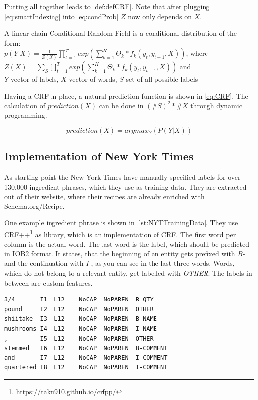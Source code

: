 \documentclass[12pt, twoside]{report}
\begin{document}
Putting all together leads to \cref{def:defCRF}. Note that after plugging \cref{eq:smartIndexing} into \cref{eq:condProb} $Z$ now only depends on $X$.

\begin{defn} \label{def:defCRF}
    A linear-chain Conditional Random Field is a conditional distribution of the form: \vspace*{0.5em} \\
    $p(Y|X) = \frac{1}{Z(X)}\prod_{t=1}^T exp(\sum_{k=1}^{K} \Theta_{k} * f_k(y_t, y_{t-1}, X))$, where \\
    \hspace*{2em}$Z(X) = \sum_{S}^{}\prod_{t=1}^T exp(\sum_{k=1}^{K} \Theta_{k} * f_k(y_t, y_{t-1}, X))$ and \\
    \hspace*{2em}$Y$ vector of labels, $X$ vector of words, $S$ set of all possible labels
\end{defn}

Having a CRF in place, a natural prediction function is shown in \cref{eq:CRF}. The calculation of $prediction(X)$ can be done in $(\#S)^2*\#X$ through dynamic programming.

\begin{equation}\label{eq:CRF}
prediction(X) = argmax_Y(P(Y|X))
\end{equation}

\subsection{Implementation of New York Times}
As starting point the New York Times have manually specified labels for over 130,000 ingredient phrases, which they use as training data. They are extracted out of their website, where their recipes are already enriched with Schema.org/Recipe.

One example ingredient phrase is shown in \cref{lst:NYTTrainingData}. They use CRF++\footnote{https://taku910.github.io/crfpp/} as library, which is an implementation of CRF. The first word per column is the actual word. The last word is the label, which should be predicted in IOB2 format. It states, that the beginning of an entity gets prefixed with \textit{B-} and the continuation with \textit{I-}, as you can see in the last three words. Words, which do not belong to a relevant entity, get labelled with \textit{OTHER}. The labels in between are custom features. 

\begin{lstlisting}[frame=single, caption={Extract of the training data for New York Times CRF}, label=lst:NYTTrainingData]
3/4       I1  L12	 NoCAP	NoPAREN	 B-QTY
pound     I2  L12	 NoCAP	NoPAREN	 OTHER
shiitake  I3  L12	 NoCAP	NoPAREN	 B-NAME
mushrooms I4  L12	 NoCAP	NoPAREN	 I-NAME
,         I5  L12	 NoCAP	NoPAREN	 OTHER
stemmed   I6  L12	 NoCAP	NoPAREN	 B-COMMENT
and       I7  L12	 NoCAP	NoPAREN	 I-COMMENT
quartered I8  L12	 NoCAP	NoPAREN	 I-COMMENT
\end{lstlisting}
\end{document}
